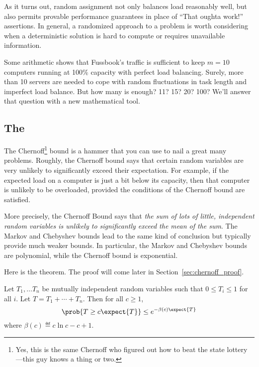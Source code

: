 As it turns out, random assignment not only balances load reasonably
well, but also permits provable performance guarantees in place of
``That oughta work!''  assertions.  In general, a randomized approach
to a problem is worth considering when a deterministic solution is
hard to compute or requires unavailable information.

Some arithmetic shows that Fussbook's traffic is sufficient to keep $m
= 10$ computers running at 100\% capacity with perfect load balancing.
Surely, more than 10 servers are needed to cope with random
fluctuations in task length and imperfect load balance.  But how many
is enough?  11?  15?  20?  100? We'll answer that question with a new
mathematical tool.

\subsection{The }\label{chernoff_sec}

The Chernoff\footnote{Yes, this is the same Chernoff who figured out
  how to beat the state lottery ---this guy knows a thing or two.}
bound is a hammer that you can use to nail a great many problems.
Roughly, the Chernoff bound says that certain random variables are
very unlikely to significantly exceed their expectation.  For example,
if the expected load on a computer is just a bit below its capacity,
then that computer is unlikely to be overloaded, provided the
conditions of the Chernoff bound are satisfied.

More precisely, the Chernoff Bound says that \emph{the sum of lots of
  little, independent random variables is unlikely to significantly
  exceed the mean of the sum}.  The Markov and Chebyshev bounds lead
to the same kind of conclusion but typically provide much weaker
bounds.  In particular, the Markov and Chebyshev bounds are
polynomial, while the Chernoff bound is exponential.

Here is the theorem.  The proof will come later in
Section~\ref{sec:chernoff_proof}.

\begin{theorem}
\label{thm:chernoff}
Let $T_1, \dots T_n$ be mutually independent random variables such
that $0 \leq T_i \leq 1$ for all $i$.  Let $T = T_1 + \cdots + T_n$.
Then for all $c \geq 1$,
\begin{equation}\label{chernoff-leq}
\prob{T \geq c \expect{T}} \leq e^{-\beta(c) \expect{T}}
\end{equation}
where $\beta(c) \eqdef c \ln c - c + 1$.
\end{theorem}

